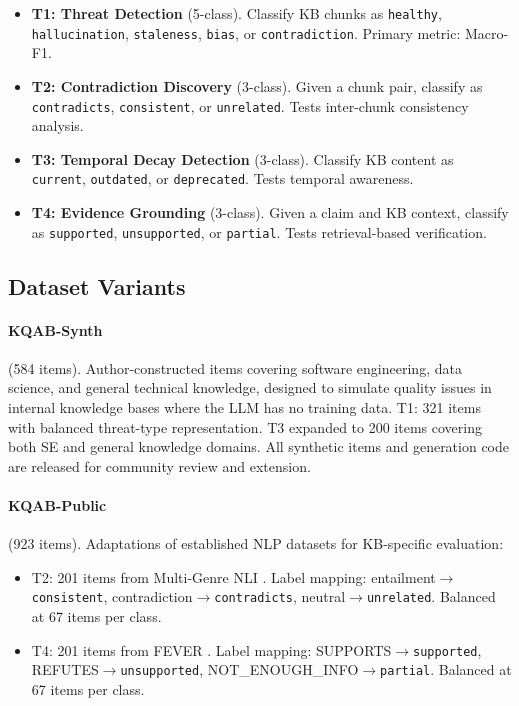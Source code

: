 \documentclass[11pt]{article}
\begin{document}
\begin{itemize}
    \item \textbf{T1: Threat Detection} (5-class). Classify KB chunks as \texttt{healthy}, \texttt{hallucination}, \texttt{staleness}, \texttt{bias}, or \texttt{contradiction}. Primary metric: Macro-F1.
    \item \textbf{T2: Contradiction Discovery} (3-class). Given a chunk pair, classify as \texttt{contradicts}, \texttt{consistent}, or \texttt{unrelated}. Tests inter-chunk consistency analysis.
    \item \textbf{T3: Temporal Decay Detection} (3-class). Classify KB content as \texttt{current}, \texttt{outdated}, or \texttt{deprecated}. Tests temporal awareness.
    \item \textbf{T4: Evidence Grounding} (3-class). Given a claim and KB context, classify as \texttt{supported}, \texttt{unsupported}, or \texttt{partial}. Tests retrieval-based verification.
\end{itemize}

\subsection{Dataset Variants}

\paragraph{KQAB-Synth} (584 items). Author-constructed items covering software engineering, data science, and general technical knowledge, designed to simulate quality issues in internal knowledge bases where the LLM has no training data. T1: 321 items with balanced threat-type representation. T3 expanded to 200 items covering both SE and general knowledge domains. All synthetic items and generation code are released for community review and extension.

\paragraph{KQAB-Public} (923 items). Adaptations of established NLP datasets for KB-specific evaluation:
\begin{itemize}
    \item T2: 201 items from Multi-Genre NLI \citep{williams2018broad}. Label mapping: entailment$\to$\texttt{consistent}, contradiction$\to$\texttt{contradicts}, neutral$\to$\texttt{unrelated}. Balanced at 67 items per class.
    \item T4: 201 items from FEVER \citep{thorne2018fever}. Label mapping: SUPPORTS$\to$\texttt{supported}, REFUTES$\to$\texttt{unsupported}, NOT\_ENOUGH\_INFO$\to$\texttt{partial}. Balanced at 67 items per class.
\end{itemize}
\end{document}
